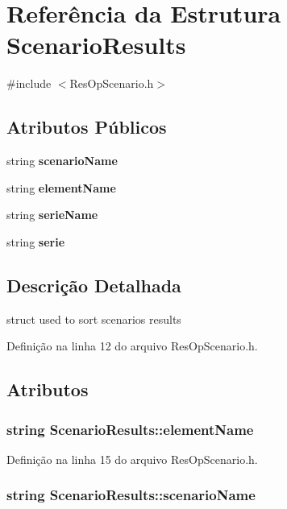 \section{Referência da Estrutura Scenario\+Results}
\label{struct_scenario_results}


{\ttfamily \#include $<$Res\+Op\+Scenario.\+h$>$}

\subsection*{Atributos Públicos}
\begin{DoxyCompactItemize}
\item 
string {\bf scenario\+Name}
\item 
string {\bf element\+Name}
\item 
string {\bf serie\+Name}
\item 
string {\bf serie}
\end{DoxyCompactItemize}


\subsection{Descrição Detalhada}
struct used to sort scenarios results 

Definição na linha 12 do arquivo Res\+Op\+Scenario.\+h.



\subsection{Atributos}
\subsubsection[{element\+Name}]{\setlength{\rightskip}{0pt plus 5cm}string Scenario\+Results\+::element\+Name}\label{struct_scenario_results_ae8180f8466e4710b59cda5433ac5de12}


Definição na linha 15 do arquivo Res\+Op\+Scenario.\+h.

\subsubsection[{scenario\+Name}]{\setlength{\rightskip}{0pt plus 5cm}string Scenario\+Results\+::scenario\+Name}\label{struct_scenario_results_a9fcde4f1d678ff85b84ae314386c1040}


